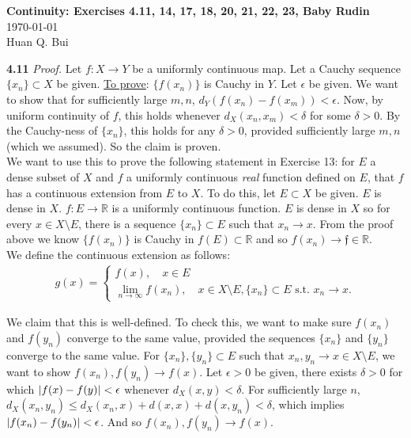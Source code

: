 \documentclass[11pt]{article}
\begin{document}
\begin{center}
{\Large\bf  Continuity:  Exercises 4.11, 14, 17, 18, 20, 21, 22, 23, Baby Rudin}\\
$\,$\\
\today\\
$\,$\\
{\Large  Huan Q. Bui}
\end{center}


\noindent \textbf{4.11}
\noindent \textit{Proof.}  Let $f: X \to Y$ be a uniformly continuous map. Let a Cauchy sequence $\{ x_n\} \subset X$ be given. \underline{To prove}: $\{ f(x_n)\}$ is Cauchy in $Y$. Let $\epsilon$ be given. We want to show that for sufficiently large $m,n$, $d_Y (f(x_n) - f(x_m)) < \epsilon$. Now, by uniform continuity of $f$, this holds whenever $d_X(x_n, x_m) < \delta$ for some $\delta > 0$. By the Cauchy-ness of $\{x_n\}$, this holds for any $\delta > 0$, provided sufficiently large $m,n$ (which we assumed). So the claim is proven.\\


We want to use this to prove the following statement in Exercise 13: for $E$ a dense subset of $X$ and $f$ a uniformly continuous \textit{real} function defined on $E$, that $f$ has a continuous extension from $E$ to $X$. To do this, let $E \subset X$ be given. $E$ is dense in $X$. $f: E \to \mathbb{R}$ is a uniformly continuous function. $E$ is dense in $X$ so for every $x \in X\setminus E$, there is a sequence $\{ x_n\} \subset E$ such that $x_n \to x$. From the proof above we know $\{ f(x_n)\}$ is Cauchy in $f(E) \subset \mathbb{R}$ and so $ f(x_n) \to \mathfrak{f} \in \mathbb{R}$. \\



We define the continuous extension as follows:
\begin{align*}
g(x) = \begin{cases}
f(x), \quad x \in E\\
\lim_{n\to \infty} f(x_n), \quad x \in X\setminus E, \{ x_n\} \subset E \mbox{ s.t. }  x_n \to x.
\end{cases}
\end{align*}

We claim that this is well-defined. To check this, we want to make sure $f(x_n)$ and $f(y_n)$ converge to the same value, provided the sequences $\{x_n\}$ and $\{ y_n\}$ converge to the same value. For $\{ x_n\}, \{ y_n\} \subset E$ such that $x_n, y_n \to x \in X\setminus E$, we want to show $f(x_n), f(y_n) \to f(x)$. Let $\epsilon > 0$ be given, there exists $\delta >0$ for which $\abs{f(x) - f(y)} < \epsilon$ whenever $d_X(x,y) < \delta$. For sufficiently large $n$, $d_X(x_n ,y_n) \leq d_X(x_n, x) + d(x,x) + d(x,y_n) < \delta $, which implies $\abs{f(x_n) - f(y_n)} < \epsilon$. And so $f(x_n),f(y_n) \to f(x)$. \\
\end{document}
